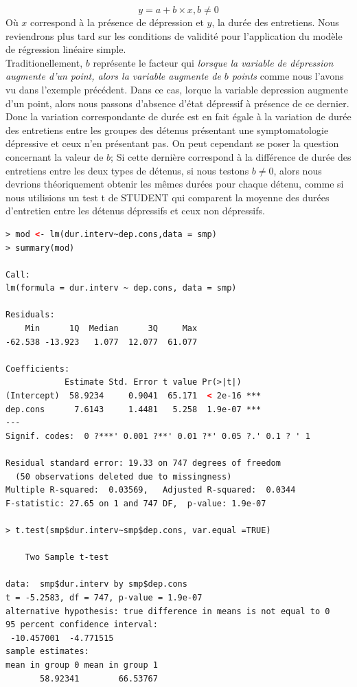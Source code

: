 $$ y = a + b\times x, b \neq 0$$ 
Où $x$ correspond à la présence de dépression et $y$, la durée des entretiens. Nous reviendrons plus tard sur les conditions de validité pour l'application du modèle de régression linéaire simple.\newline 
\\
Traditionellement, $b$ représente le facteur qui \textit{lorsque la variable de dépression augmente d'un point, alors la variable augmente de $b$ points} comme nous l'avons vu dans l'exemple précédent.\newline
Dans ce cas, lorque la variable depression augmente d'un point, alors nous passons d'absence d'état dépressif à présence de ce dernier.\newline 
Donc la variation correspondante de durée est en fait égale à la variation de durée des entretiens entre les groupes des détenus présentant une symptomatologie dépressive et ceux n'en présentant pas.\newline 
On peut cependant se poser la question concernant la valeur de $b$; Si cette dernière correspond à la différence de durée des entretiens entre les deux types de détenus, si nous testons $b\neq 0$, alors nous devrions théoriquement obtenir les mêmes durées pour chaque détenu, comme si nous utilisions un test t de STUDENT qui comparent la moyenne des durées d'entretien entre les détenus dépressifs et ceux non dépressifs.\newline
\begin{lstlisting}[language=html]
> mod <- lm(dur.interv~dep.cons,data = smp)
> summary(mod)

Call:
lm(formula = dur.interv ~ dep.cons, data = smp)

Residuals:
    Min      1Q  Median      3Q     Max 
-62.538 -13.923   1.077  12.077  61.077 

Coefficients:
            Estimate Std. Error t value Pr(>|t|)    
(Intercept)  58.9234     0.9041  65.171  < 2e-16 ***
dep.cons      7.6143     1.4481   5.258  1.9e-07 ***
---
Signif. codes:  0 ?***' 0.001 ?**' 0.01 ?*' 0.05 ?.' 0.1 ? ' 1

Residual standard error: 19.33 on 747 degrees of freedom
  (50 observations deleted due to missingness)
Multiple R-squared:  0.03569,	Adjusted R-squared:  0.0344 
F-statistic: 27.65 on 1 and 747 DF,  p-value: 1.9e-07

> t.test(smp$dur.interv~smp$dep.cons, var.equal =TRUE)

	Two Sample t-test

data:  smp$dur.interv by smp$dep.cons
t = -5.2583, df = 747, p-value = 1.9e-07
alternative hypothesis: true difference in means is not equal to 0
95 percent confidence interval:
 -10.457001  -4.771515
sample estimates:
mean in group 0 mean in group 1 
       58.92341        66.53767 
\end{lstlisting}
